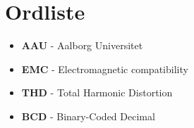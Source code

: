 \section*{Ordliste}
\begin{itemize}
\item \textbf{AAU} - Aalborg Universitet
\item \textbf{EMC} - Electromagnetic compatibility
\item \textbf{THD} - Total Harmonic Distortion
\item \textbf{BCD} - Binary-Coded Decimal
\end{itemize}

\newpage